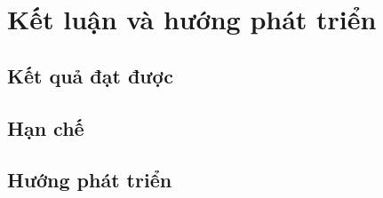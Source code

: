 \chapter{Kết luận và hướng phát triển}
\label{ch:conclusion}

\section{Kết quả đạt được}

\section{Hạn chế}

\section{Hướng phát triển}
